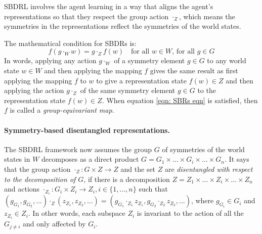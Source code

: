 SBDRL involves the agent learning in a way that aligns the agent's representations so that they respect the group action $\cdot_{Z}$, which means the symmetries in the representations reflect the symmetries of the world states.

The mathematical condition for SBDRs is:
\begin{equation}\label{eqn: SBRs eqn}
	f(g \cdot_{W} w) = g \cdot_{Z} f(w) \quad \text{for all $w\in W$, for all $g \in G$}
\end{equation}
In words, applying any action $g \cdot_{W}$ of a symmetry element $g \in G$ to any world state $w \in W$ and then applying the mapping $f$ gives the same result as first applying the mapping $f$ to $w$ to give a representation state $f(w) \in Z$ and then applying the action $g \cdot_Z$ of the same symmetry element $g \in G$ to the representation state $f(w) \in Z$.
When equation \ref{eqn: SBRs eqn} is satisfied, then $f$ is called a \emph{group-equivariant map}.

\paragraph{Symmetry-based disentangled representations.}
The SBDRL framework now assumes the group $G$ of symmetries of the world states in $W$ decomposes as a direct product $G = G_1 \times \hdots \times G_i \times \hdots \times G_n$.
It says that the group action $\cdot_Z : G \times Z \to Z$ and the set $Z$ are \emph{disentangled with respect to the decomposition of $G$}, if there is a decomposition $Z = Z_1 \times \hdots \times Z_i \times \hdots \times Z_n$ and actions $\cdot_{Z_i}: G_i \times Z_i \to Z_i, i \in \{1, \hdots, n\}$ such that $(g_{G_1}, g_{G_2},...) \cdot_Z (z_{Z_1}, z_{Z_2},...) = (g_{G_1} \cdot_{Z_1} z_{Z_1}, g_{G_2} \cdot_{Z_2} z_{Z_2},...)$, where $g_{G_i} \in G_i$ and $z_{Z_i} \in Z_i$.
In other words, each subspace $Z_i$ is invariant to the action of all the $G_{j \neq i}$ and only affected by $G_i$.

